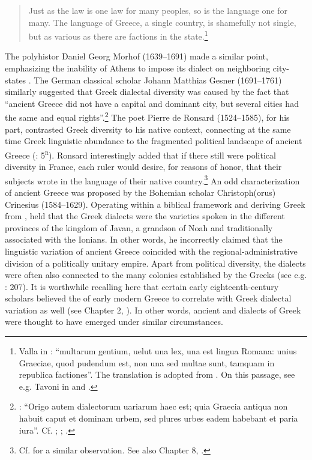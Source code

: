\begin{quote}
Just as the  law is one law for many peoples, so is the  language one for many. The language of Greece, a single country, is shamefully not single, but as various as there are factions in the state.\footnote{Valla in \citet[122]{Regoliosi1993}: “multarum gentium, uelut una lex, una est lingua Romana: unius Graeciae, quod pudendum est, non una sed multae sunt, tamquam in republica factiones”. The translation is adopted from \citet[10]{Trapp1990}. On this passage, see e.g. Tavoni in \citet[90 n.55]{Benvoglienti1975} and \citet[212--213]{Trovato1984}.}
\end{quote}

The polyhistor Daniel Georg Morhof (1639–1691) made a similar point, emphasizing the inability of Athens to impose its dialect on neighboring city-states \citep[146]{Morhof1685}. The German classical scholar Johann Matthias Gesner (1691–1761) similarly suggested that Greek dialectal diversity was caused by the fact that “ancient Greece did not have a capital and dominant city, but several cities had the same and equal rights”.\footnote{\citet[160--161]{Gesner1774}: “Origo autem dialectorum uariarum haec est; quia Graecia antiqua non habuit caput et dominam urbem, sed plures urbes eadem habebant et paria iura”. Cf. \citet[395--396]{Rollin1731}; \citet[136--138]{Priestley1762}; \citet[204]{Ries1786}.} The poet Pierre de Ronsard (1524–1585), for his part, contrasted Greek diversity to his native  context, connecting at the same time Greek linguistic abundance to the fragmented political landscape of ancient Greece (\citeyear{Ronsard1565}: 5\textsc{\textsuperscript{r}}). Ronsard interestingly added that if there still were political diversity in France, each ruler would desire, for reasons of honor, that their subjects wrote in the language of their native country.\footnote{Cf. \citet[lxviii]{Court1778} for a similar observation. See also Chapter 8, .} An odd characterization of ancient Greece was proposed by the Bohemian  scholar Christoph(orus) Crinesius (1584–1629). Operating within a biblical framework and deriving Greek from , \citet[77]{Crinesius1629} held that the Greek dialects were the varieties spoken in the different provinces of the kingdom of Javan, a grandson of Noah and traditionally associated with the Ionians. In other words, he incorrectly claimed that the linguistic variation of ancient Greece coincided with the regional-administrative division of a politically unitary empire. Apart from political diversity, the dialects were often also connected to the many colonies established by the Greeks (see e.g. \citealt{Simonis1752}: 207). It is worthwhile recalling here that certain early eighteenth-century scholars believed the  of early modern Greece to correlate with  Greek dialectal variation as well (see Chapter 2, ). In other words, ancient and  dialects of Greek were thought to have emerged under similar circumstances.


